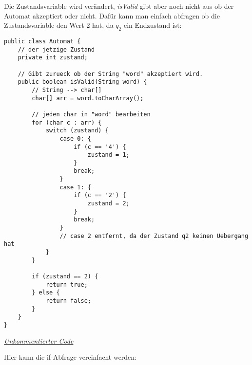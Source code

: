 \begin{flushleft}
    Die Zustandsvariable wird verändert, \textit{isValid} gibt aber noch nicht aus ob der Automat akzeptiert oder nicht.
    Dafür kann man einfach abfragen ob die Zustandsvariable den Wert 2 hat, da $q_2$ ein Endzustand ist:
\end{flushleft}

\begin{center}
\begin{lstlisting}
public class Automat {
    // der jetzige Zustand
    private int zustand;

    // Gibt zurueck ob der String "word" akzeptiert wird.
    public boolean isValid(String word) {
        // String --> char[]
        char[] arr = word.toCharArray();

        // jeden char in "word" bearbeiten
        for (char c : arr) {
            switch (zustand) {
                case 0: {
                    if (c == '4') {
                        zustand = 1;
                    }
                    break;
                }
                case 1: {
                    if (c == '2') {
                        zustand = 2;
                    }
                    break;
                }
                // case 2 entfernt, da der Zustand q2 keinen Uebergang hat
            }
        }

        if (zustand == 2) {
            return true;
        } else {
            return false;
        }
    }
}
\end{lstlisting}
\href{https://raw.githubusercontent.com/tim-tm/articles/refs/heads/main/informatik-notes/code/Automat.java}{\textit{Unkommentierter Code}} \\
\end{center}

\begin{flushleft}
    Hier kann die if-Abfrage vereinfacht werden: 
\end{flushleft}


